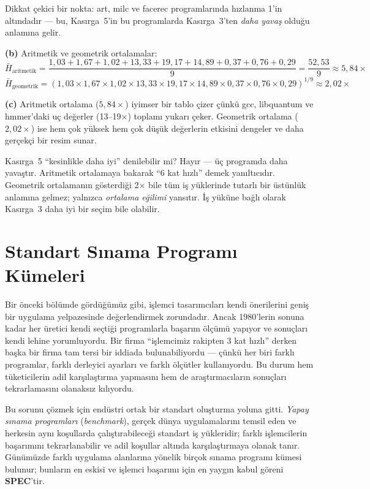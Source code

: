 \begin{ornek}[2.8]
Dikkat çekici bir nokta: art, milc ve facerec programlarında hızlanma 1'in altındadır --- bu, Kasırga~5'in bu programlarda Kasırga~3'ten \emph{daha yavaş} olduğu anlamına gelir.

\textbf{(b)} Aritmetik ve geometrik ortalamalar:
\[
\bar{H}_{\text{aritmetik}} = \frac{1{,}03 + 1{,}67 + 1{,}02 + 13{,}33 + 19{,}17 + 14{,}89 + 0{,}37 + 0{,}76 + 0{,}29}{9} = \frac{52{,}53}{9} \approx 5{,}84\times
\]
\[
\bar{H}_{\text{geometrik}} = (1{,}03 \times 1{,}67 \times 1{,}02 \times 13{,}33 \times 19{,}17 \times 14{,}89 \times 0{,}37 \times 0{,}76 \times 0{,}29)^{1/9} \approx 2{,}02\times
\]

\textbf{(c)} Aritmetik ortalama ($5{,}84\times$) iyimser bir tablo çizer çünkü gcc, libquantum ve hmmer'daki uç değerler (13--19$\times$) toplamı yukarı çeker. Geometrik ortalama ($2{,}02\times$) ise hem çok yüksek hem çok düşük değerlerin etkisini dengeler ve daha gerçekçi bir resim sunar.

Kasırga~5 ``kesinlikle daha iyi'' denilebilir mi? Hayır --- üç programda daha yavaştır. Aritmetik ortalamaya bakarak ``6 kat hızlı'' demek yanıltıcıdır. Geometrik ortalamanın gösterdiği 2$\times$ bile tüm iş yüklerinde tutarlı bir üstünlük anlamına gelmez; yalnızca \emph{ortalama eğilimi} yansıtır. İş yüküne bağlı olarak Kasırga~3 daha iyi bir seçim bile olabilir.
\end{ornek}



\section{Standart Sınama Programı Kümeleri}
\label{sec:yapay-sinama}

Bir önceki bölümde gördüğümüz gibi, işlemci tasarımcıları kendi önerilerini geniş bir uygulama yelpazesinde değerlendirmek zorundadır. Ancak 1980'lerin sonuna kadar her üretici kendi seçtiği programlarla başarım ölçümü yapıyor ve sonuçları kendi lehine yorumluyordu. Bir firma ``işlemcimiz rakipten 3 kat hızlı'' derken başka bir firma tam tersi bir iddiada bulunabiliyordu --- çünkü her biri farklı programlar, farklı derleyici ayarları ve farklı ölçütler kullanıyordu. Bu durum hem tüketicilerin adil karşılaştırma yapmasını hem de araştırmacıların sonuçları tekrarlamasını olanaksız kılıyordu.

Bu sorunu çözmek için endüstri ortak bir standart oluşturma yoluna gitti. \emph{Yapay sınama programları} (\emph{benchmark}), gerçek dünya uygulamalarını temsil eden ve herkesin aynı koşullarda çalıştırabileceği standart iş yükleridir; farklı işlemcilerin başarımını tekrarlanabilir ve adil koşullar altında karşılaştırmaya olanak tanır. Günümüzde farklı uygulama alanlarına yönelik birçok sınama programı kümesi bulunur; bunların en eskisi ve işlemci başarımı için en yaygın kabul göreni \textbf{SPEC}'tir.

